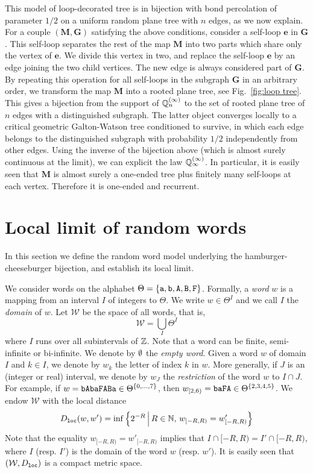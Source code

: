 \documentclass[a4paper]{article}
\newcommand*{\map}{\mathbf}
\newcommand*{\W}{\mathcal{W}}
\begin{document}
This model of loop-decorated tree is in bijection with bond percolation of parameter $1/2$ on a uniform random plane tree with $n$ edges, as we now explain.
For a couple $(\map{M,G})$ satisfying the above conditions,
consider a self-loop $\map{e}$ in $\map{G}$.
This self-loop separates the rest of the map $\map{M}$ into two parts which share only the vertex of $\map{e}$.
We divide this vertex in two, and replace the self-loop $\map{e}$ by an edge joining the two child vertices.
The new edge is always considered part of $\map{G}$.
By repeating this operation for all self-loops in the subgraph $\map{G}$ in an arbitrary order, we transform the map $\map{M}$ into a rooted plane tree, see Fig.~\ref{fig:loop tree}.
This gives a bijection from the support of $\proba[Q]\ind{\infty}_n$ to the set of rooted plane tree of $n$ edges with a distinguished subgraph.
The latter object converges locally to a critical geometric Galton-Watson tree conditioned to survive, in which each edge belongs to the distinguished subgraph with probability $1/2$ independently from other edges.
Using the inverse of the bijection above (which is almost surely continuous at the limit), we can explicit the law $\proba[Q]\ind{\infty}_\infty$.
In particular, it is easily seen that $\map{M}$ is almost surely a one-ended tree plus finitely many self-loops at each vertex.
Therefore it is one-ended and recurrent.

\section{Local limit of random words}\label{sec:words}
In this section we define the random word model underlying the hamburger-cheeseburger bijection, and establish its local limit.

We consider words on the alphabet $\Theta=\{\xa,\xb,\xA,\xB,\xF\}$.
Formally, a \emph{word} $w$ is a mapping from an interval $I$ of integers to $\Theta$.
We write $w\in\Theta^I$ and we call $I$ the \emph{domain} of $w$.
Let $\W$ be the space of all words, that is,
\begin{equation}
\W = \bigcup_I \Theta^I
\end{equation}
where $I$ runs over all subintervals of $\integer$.
Note that a word can be finite, semi-infinite or bi-infinite.
We denote by $\emptystr$ the \emph{empty word}.
Given a word $w$ of domain $I$ and $k\in I$, we denote by $w_k$ the letter of index $k$ in $w$.
More generally, if $J$ is an (integer or real) interval, we denote by $w_J$ the \emph{restriction} of the word $w$ to $I\cap J$.
For example, if $w = \xb\xA\xb\xa\xF\xA\xB\xa\in \Theta^{\{0,\ldots,7\}}$, then $w_{[2,6)} = \xb\xa\xF\xA \in\Theta^{\{2,3,4,5\}}$. We endow $  \mathcal{W}$ with the local distance 
\begin{equation}\label{eq:def Dloc}
	D\sub{loc}(w,w') = \inf \set{ 2^{-R} }{ R\in\natural,\, w_{[-R,R)} = w'_{[-R,R)} }
\end{equation}
Note that the equality $w_{[-R,R)} = w'_{[-R,R)}$ implies that $I\cap [-R,R) = I'\cap [-R,R)$, where $I$ (resp. $I'$) is the domain of the word $w$ (resp. $w'$). It is easily seen that $(\W,D\sub{loc})$ is a compact metric space.
\end{document}
